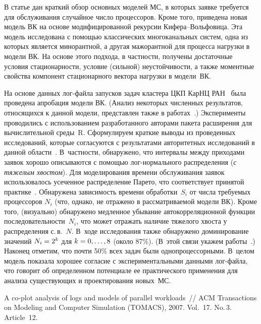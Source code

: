 \begin{multicols}{2}
В  статье  дан краткий обзор основных  моделей МС, в которых  заявке
требуется  для обслуживания случайное число процессоров.   Кроме того,
 приведена новая модель ВК на основе модифицированной
рекурсии Ки\-фе\-ра--Воль\-фо\-ви\-ца. Эта модель исследована  с по\-мощью
классических многоканальных систем, одна из которых является
минорантной, а другая   мажорантной для процесса нагрузки в  модели
ВК. На основе этого подхода, в частности, получены   достаточные
условия стационарности, условие (сильной) неустойчивости, а также
моментные свойства компонент стационарного вектора нагрузки в модели~ВК.

На основе данных лог-фай\-ла запусков задач кластера ЦКП КарНЦ
РАН~\cite{cluster} была проведена апробация модели ВК. (Анализ
некоторых численных результатов, относящихся к данной модели,
представлен также в работах~\cite{krc11, aptpms11, hpc11}.)
Эксперименты проводились с использованием разработанного авторами
пакета расширения для вычислительной среды~R. Сформулируем  краткие
выводы из проведенных    исследований, которые   согласуются с
результатами авторитетных исследований в данной
области~\cite{feit-coplot}. В~част\-ности, обнаружено, что интервалы
между приходами заявок хорошо описываются с помощью лог-нормального
распределения ({\it с тяжелым хвостом}). Для моделирования времени
обслуживания заявок использовалось усеченное распределение Парето,
что соответствует принятой практике~\cite{gupta10}.  Обнаружена
зависимость времени обработки~$S_i$  от числа требуемых процессоров
$N_{i}$ (что, однако, не отражено в рассматриваемой модели ВК). Кроме
того, (визуально) обнаружено медленное убывание автокорреляционной
функции последовательности~$N_{i}$, что  может отражать наличие
тяжелого хвоста у  распределения с.\,в.~$N$.
 В~ходе исследования также обнаружено  доминирование значений
$N_i\hm=2^k$ для   $k\hm=0,\ldots,8$
 (около 87\%). (В~этой связи   укажем  работы~\cite{krampe10, downey99}.)
Наконец отметим, что почти 50\% всех задач были
однопроцессорными. В~целом модель показала хорошее согласие с
экспериментальными данными лог-фай\-ла, что говорит об определенном
потенциале ее практического применения для анализа существующих и
проектирования новых~МС.

{\small\frenchspacing
{%
\begin{thebibliography}{99}

A co-plot analysis of logs and models of parallel workloads~// 
ACM Transactions on Modeling and Computer Simulation (TOMACS), 2007. Vol.~17. No.\,3. Article~12.


\end{thebibliography}}}
\end{multicols}

